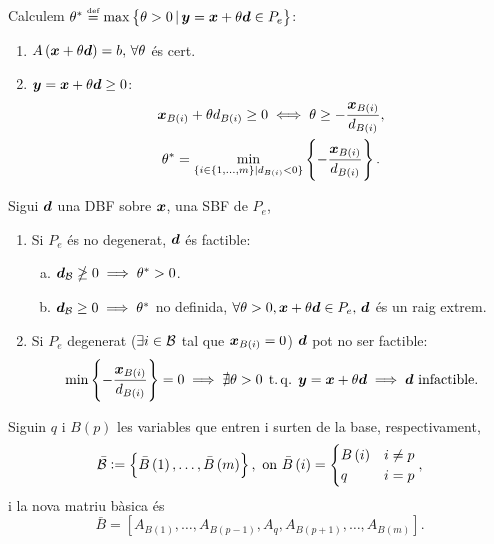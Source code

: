 \begin{prop}
    Calculem $\theta^* \stackrel{\text{\tiny def}}{=} \max \left\{ \theta > 0 \, |\, \boldsymbol{y} = \boldsymbol{x} + \theta \boldsymbol{d} \in P_e\right\}$:
    \begin{enumerate}
        \item $A\left(\boldsymbol{x} + \theta \boldsymbol{d}\right) = b,\, \forall \theta$ és cert.
        \item $\boldsymbol{y} = \boldsymbol{x} + \theta \boldsymbol{d} \geq 0$:
            \begin{gather*}
                \boldsymbol{x}_{B\left(i\right)} + \theta d_{B\left(i\right)} \geq 0 \iff \theta \geq -\frac{\boldsymbol{x}_{B\left(i\right)}}{d_{B\left(i\right)}}, \\
                \theta^* = \min_{\{i \in \left\{1, \dots, m \right\} \mid 
                d_{B\left(i\right)} < 0\}} \left\{ - 
                \frac{\boldsymbol{x}_{B\left(i\right)}}{d_{B\left(i\right)}} \right\}.
            \end{gather*}
    \end{enumerate}
\end{prop}
\begin{prop}
    Sigui $\boldsymbol{d}$ una DBF sobre $\boldsymbol{x}$, una SBF de $P_e$,
    \begin{enumerate}
        \item Si $P_e$ és no degenerat, $\boldsymbol{d}$ és factible:
            \begin{enumerate}[a)]
                \item $\boldsymbol{d}_{\mathcal{B}} \ngeq 0 \implies \theta^* > 0$.
                \item $\boldsymbol{d}_{\mathcal{B}} \geq 0 \implies \theta^*$ no definida, $\forall \theta > 0, \boldsymbol{x} + \theta \boldsymbol{d} \in P_e,\, \boldsymbol{d}$ és un raig extrem.
            \end{enumerate}
        \item Si $P_e$ degenerat ($\exists i \in \mathcal{B}$ tal que $\boldsymbol{x}_{B\left(i\right)} = 0$) $\boldsymbol{d}$ pot no ser factible:
            \begin{gather*}
                \min \left\{ -\frac{\boldsymbol{x}_{B\left(i\right)}}{d_{B\left(i\right)}} \right\} = 0 \implies \nexists \theta > 0 \operatorname{\;t.q.\;} \boldsymbol{y} = \boldsymbol{x}+\theta \boldsymbol{d} \implies \boldsymbol{d} \text{ infactible}.
            \end{gather*}
    \end{enumerate}
\end{prop}
\begin{prop}
    Siguin $q$ i $B\left(p\right)$ les variables que entren i surten de la base, respectivament,
    \begin{gather*}
        \bar{\mathcal{B}} := \left\{ \bar{B}\left(1\right), \dots, \bar{B}\left(m\right) \right\}, \text{ on } \bar{B}\left(i\right) =
        \begin{cases}
            B\left(i\right) & i \neq p \\
            q & i = p
        \end{cases},
    \end{gather*}
    i la nova matriu bàsica és
    \[ \bar{B} = \left[A_{B\left(1\right)}, \dots, A_{B\left(p-1\right)}, A_q, A_{B\left(p+1\right)}, \dots, A_{B\left(m\right)} \right]. \]
\end{prop}
